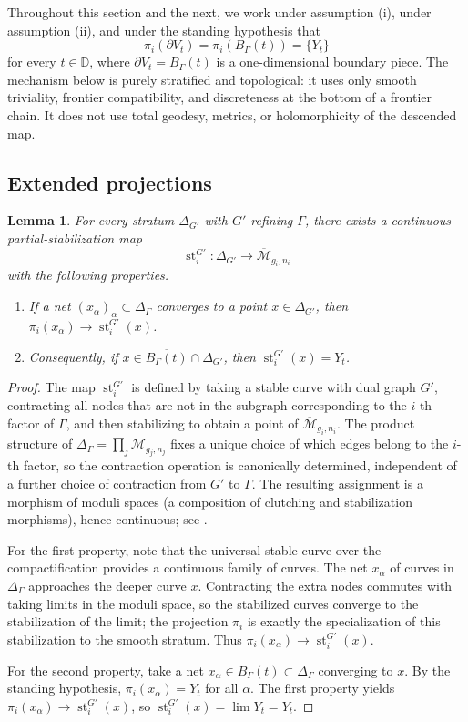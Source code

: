 \documentclass[12pt]{article}
\theoremstyle{plain}
\newtheorem{lemma}[theorem]{Lemma}
\theoremstyle{definition}
\theoremstyle{remark}
\newcommand{\D}{\mathbb D}
\newcommand{\M}{\mathcal M}
\newcommand{\bMfac}{\overline{\M}_{g_i,n_i}}
\newcommand{\st}{\operatorname{st}}
\begin{document}
Throughout this section and the next, we work under assumption (i), under assumption (ii), and under the standing hypothesis that
\[
\pi_i(\partial V_t)=\pi_i(B_\Gamma(t))=\{Y_t\}
\]
for every \(t\in\D\), where \(\partial V_t = B_\Gamma(t)\) is a one-dimensional boundary piece.  The mechanism below is purely stratified and topological: it uses only smooth triviality, frontier compatibility, and discreteness at the bottom of a frontier chain.  It does not use total geodesy, metrics, or holomorphicity of the descended map.

\subsection{Extended projections}

\begin{lemma}\label{lem:extended-projection}
For every stratum \(\Delta_{G'}\) with \(G'\) refining \(\Gamma\), there exists a continuous partial-stabilization map
\[
\st_i^{G'}:\Delta_{G'}\longrightarrow \bMfac
\]
with the following properties.
\begin{enumerate}[label=(\alph*)]
\item If a net \((x_\alpha)_\alpha\subset\Delta_\Gamma\) converges to a point \(x\in\Delta_{G'}\), then \(\pi_i(x_\alpha)\to \st_i^{G'}(x)\).
\item Consequently, if \(x\in \overline{B_\Gamma(t)}\cap\Delta_{G'}\), then \(\st_i^{G'}(x)=Y_t\).
\end{enumerate}
\end{lemma}

\begin{proof}
The map \(\st_i^{G'}\) is defined by taking a stable curve with dual graph \(G'\), contracting all nodes that are not in the subgraph corresponding to the \(i\)-th factor of \(\Gamma\), and then stabilizing to obtain a point of \(\overline{\M}_{g_i,n_i}\).  The product structure of \(\Delta_\Gamma=\prod_{j}\M_{g_j,n_j}\) fixes a unique choice of which edges belong to the \(i\)-th factor, so the contraction operation is canonically determined, independent of a further choice of contraction from \(G'\) to \(\Gamma\).  The resulting assignment is a morphism of moduli spaces (a composition of clutching and stabilization morphisms), hence continuous; see \cite{Knu83,DM69}.

For the first property, note that the universal stable curve over the compactification provides a continuous family of curves.  The net \(x_\alpha\) of curves in \(\Delta_\Gamma\) approaches the deeper curve \(x\).  Contracting the extra nodes commutes with taking limits in the moduli space, so the stabilized curves converge to the stabilization of the limit; the projection \(\pi_i\) is exactly the specialization of this stabilization to the smooth stratum.  Thus \(\pi_i(x_\alpha)\to \st_i^{G'}(x)\).

For the second property, take a net \(x_\alpha\in B_\Gamma(t)\subset\Delta_\Gamma\) converging to \(x\).  By the standing hypothesis, \(\pi_i(x_\alpha)=Y_t\) for all \(\alpha\).  The first property yields \(\pi_i(x_\alpha)\to\st_i^{G'}(x)\), so \(\st_i^{G'}(x)=\lim Y_t = Y_t\).
\end{proof}
\end{document}

